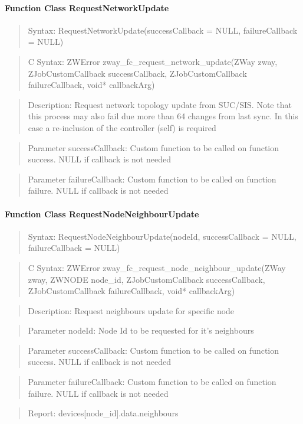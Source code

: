 \paragraph{Function Class RequestNetworkUpdate}
\begin{quote}Syntax: RequestNetworkUpdate(successCallback = NULL, failureCallback = NULL)\end{quote}
\begin{quote}C Syntax: ZWError zway\_fc\_request\_network\_update(ZWay zway, ZJobCustomCallback successCallback, ZJobCustomCallback failureCallback, void* callbackArg)\end{quote}
\begin{quote}Description: Request network topology update from SUC/SIS. Note that this process may also fail due more than 64 changes from last sync. In this case a re-inclusion of the controller (self) is required\end{quote}
\begin{quote}Parameter successCallback: Custom function to be called on function success. NULL if callback is not needed\end{quote}
\begin{quote}Parameter failureCallback: Custom function to be called on function failure. NULL if callback is not needed\end{quote}


\paragraph{Function Class RequestNodeNeighbourUpdate}
\begin{quote}Syntax: RequestNodeNeighbourUpdate(nodeId, successCallback = NULL, failureCallback = NULL)\end{quote}
\begin{quote}C Syntax: ZWError zway\_fc\_request\_node\_neighbour\_update(ZWay zway, ZWNODE node\_id, ZJobCustomCallback successCallback, ZJobCustomCallback failureCallback, void* callbackArg)\end{quote}
\begin{quote}Description: Request neighbours update for specific node\end{quote}
\begin{quote}Parameter nodeId: Node Id to be requested for it's neighbours\end{quote}
\begin{quote}Parameter successCallback: Custom function to be called on function success. NULL if callback is not needed\end{quote}
\begin{quote}Parameter failureCallback: Custom function to be called on function failure. NULL if callback is not needed\end{quote}
\begin{quote}Report: devices[node\_id].data.neighbours\end{quote}

